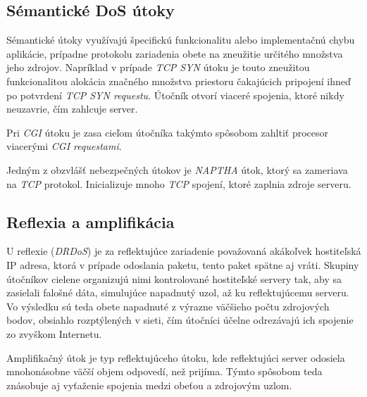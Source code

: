 \documentclass[
  digital, %
  table,   %
  lof,     %
  nolot,   %
  nocover
]{fithesis3}
\begin{document}
\subsection{Sémantické DoS útoky}
Sémantické útoky využívajú špecifickú funkcionalitu alebo implementačnú chybu aplikácie,
prípadne protokolu zariadenia obete na zneužitie určitého množstva jeho zdrojov. Napríklad
v prípade \textit{TCP SYN} útoku je touto zneužitou funkcionalitou alokácia značného množstva
priestoru čakajúcich pripojení ihneď po potvrdení \textit{ TCP SYN requestu}. Útočník otvorí
viaceré spojenia, ktoré nikdy neuzavrie, čím zahlcuje server. 

Pri \textit{CGI} útoku je zasa cieľom útočníka takýmto spôsobom zahltiť procesor viacerými
\textit{CGI requestami}.

Jedným z obzvlášť nebezpečných útokov je \textit{NAPTHA} útok, ktorý sa zameriava na
\textit{TCP} protokol. Inicializuje mnoho \textit{TCP} spojení, ktoré zaplnia zdroje serveru.

\subsection{Reflexia a amplifikácia}
U reflexie (\textit{DRDoS}) je za reflektujúce zariadenie považovaná akákoľvek hostiteľská IP adresa, 
ktorá v prípade odoslania
paketu, tento paket spätne aj vráti.
Skupiny útočníkov cielene organizujú nimi kontrolované hostiteľské servery tak, aby sa zasielali 
falošné dáta, simulujúce napadnutý uzol, až ku reflektujúcemu serveru. Vo výsledku sú teda obete 
napadnuté z výrazne väčšieho počtu zdrojových bodov, obsiahlo rozptýlených v sieti, čím útočníci účelne 
odrezávajú ich spojenie zo zvyškom Internetu.

Amplifikačný útok je typ reflektujúceho útoku, kde reflektujúci server odosiela mnohonásobne väčší 
objem odpovedí, než prijíma. Týmto spôsobom teda znásobuje aj vyťaženie spojenia medzi obeťou a 
zdrojovým uzlom.
\end{document}
